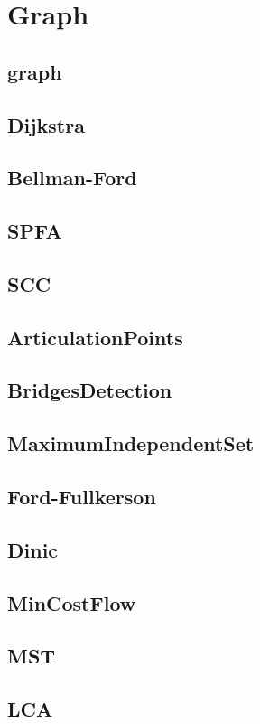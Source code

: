 \section{Graph}

\subsection{graph}


\subsection{Dijkstra}


\subsection{Bellman-Ford}


\subsection{SPFA}


\subsection{SCC}


\subsection{ArticulationPoints}


\subsection{BridgesDetection}


\subsection{MaximumIndependentSet}


\subsection{Ford-Fullkerson}


\subsection{Dinic}


\subsection{MinCostFlow}


\subsection{MST}


\subsection{LCA}

